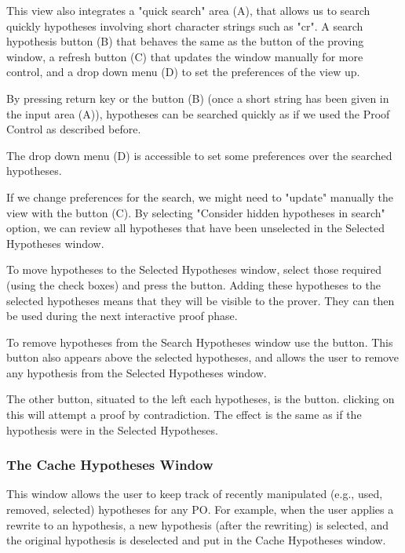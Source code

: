 This view also integrates a "quick search" area (A), that allows us to search quickly hypotheses involving short character strings such as "cr". A search hypothesis button (B) that behaves the same as the button of the proving window, a refresh button (C) that updates the window manually for more control, and a drop down menu (D) to set the preferences of the view up.

By pressing return key or the button (B) (once a short string has been given in the input area (A)), hypotheses can be searched quickly as if we used the Proof Control as described before.

The drop down menu (D) is accessible to set some preferences over the searched hypotheses.

If we change preferences for the search, we might need to "update" manually the view with the button (C). By selecting "Consider hidden hypotheses in search" option, we can review all hypotheses that have been unselected in the \textsf{Selected Hypotheses} window.

To move hypotheses to the \textsf{Selected Hypotheses} window, select those required (using the check boxes) and press the  button. Adding these hypotheses to the selected hypotheses means that they will be visible to the prover. They can then be used during the next interactive proof phase.

To remove hypotheses from the \textsf{Search Hypotheses} window use the  button. This button also appears above the selected hypotheses, and allows the user to remove any hypothesis from the \textsf{Selected Hypotheses} window.

The other button, situated to the left each hypotheses, is the  button. clicking on this will attempt a proof by contradiction. The effect is the same as if the hypothesis were in the Selected Hypotheses. 

\subsubsection{The Cache Hypotheses Window}

This window allows the user to keep track of recently manipulated (e.g., used, removed, selected) hypotheses for any PO. For example, when the user applies a rewrite to an hypothesis, a new hypothesis (after the rewriting) is selected, and the original hypothesis is deselected and put in the Cache Hypotheses window.

